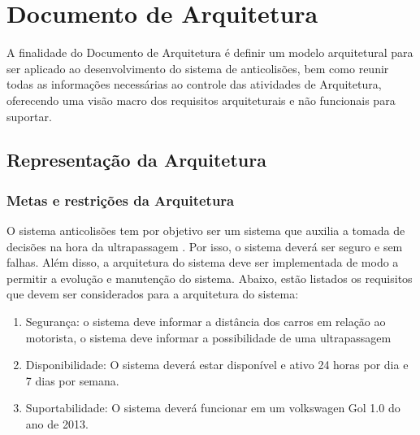 \chapter[Documento de Arquitetura]{Documento de Arquitetura}


A finalidade do Documento de Arquitetura é definir um modelo arquitetural para ser aplicado ao desenvolvimento do sistema de anticolisões, bem como reunir todas as informações necessárias ao controle das atividades de Arquitetura, oferecendo uma visão macro dos requisitos arquiteturais e não funcionais para suportar.

\section{Representação da Arquitetura}

\subsection{Metas e restrições da Arquitetura}

O sistema anticolisões tem por objetivo ser um sistema  que auxilia a tomada de decisões na hora da ultrapassagem . Por isso, o sistema  deverá ser seguro e sem falhas. Além disso, a arquitetura do sistema deve ser implementada de modo a permitir a evolução e manutenção do sistema. Abaixo, estão listados os requisitos que devem ser considerados para a arquitetura do sistema:

\begin{enumerate}
  \item Segurança: o sistema deve informar a distância dos carros em relação ao motorista, o sistema deve informar a possibilidade de uma ultrapassagem
  \item Disponibilidade: O sistema deverá estar disponível e ativo 24 horas por dia e 7 dias por semana.
  \item Suportabilidade: O sistema deverá funcionar em um volkswagen Gol 1.0 do ano de 2013.
\end{enumerate}
